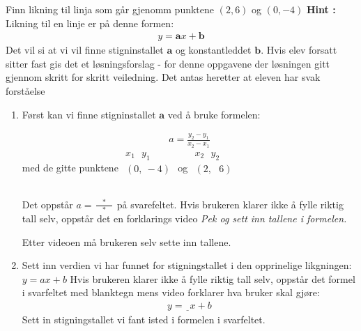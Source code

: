 \documentclass[12pt,twoside,onecolumn]{article}
\begin{document}
\begin{Exercise}
Finn likning til linja som går gjenomm punktene $(2,6)$  og  $(0,-4 )$
\newline\newline
\textbf{Hint :}\newline 
Likning til en linje er på denne formen:
\begin{align}
y=\mathbf{a}x+ \mathbf{b}
\end{align}
Det vil si at vi vil finne stigninstallet $\mathbf{a}$ og konstantleddet $\mathbf{b}$.
\newline\newline
{\color{Maroon}Hvis elev forsatt sitter fast gis det et løsningsforslag -  for denne oppgavene der løsningen gitt gjennom skritt for skritt veiledning. Det antas heretter at eleven har svak forståelse}

\begin{enumerate}
\item Først kan vi finne stigninstallet $\mathbf{a}$  ved å bruke formelen:

{\color{white}
\begin{align}
a =  \frac{y_2 - y_1}{x_2 - x_1}
\end{align}
}
med de gitte punktene
$
\begin{matrix}
  x_1\:\:\: y_1 \\ 
 (0,\:-4) \\
\phantom{0}
\end{matrix}
$ og $
\begin{matrix}
  x_2\:\:\: y_2 \\ 
 (2,\:\:\:6)  \\
\phantom{0}
\end{matrix}
$ 

{\color{Maroon} Det oppstår $a=\frac{\:\:\:\:*\:\:\:\:}{\:\:\:\:*\:\:\:\:}$ på svarefeltet.
Hvis brukeren klarer ikke å fylle riktig tall selv, oppstår det en forklarings video}
\newline
\newline
{\color{gray}\emph{Pek og sett inn tallene i formelen.} }

{\color{Maroon}  Etter videoen må brukeren selv sette inn tallene.}

\item Sett inn verdien vi har funnet for stigningstallet i den opprinelige likgningen: $y = ax + b$
{\color{Maroon}
Hvis brukeren klarer ikke å fylle riktig tall selv, oppstår det formel i svarfeltet med blanktegn mens video forklarer hva bruker skal gjøre: 
\begin{align}
y = \underline{\phantom{0}}x + b
\end{align}}
{\color{gray}Sett in stigningstallet vi fant isted i formelen i svarfeltet. }


\end{enumerate}
\end{Exercise}
\end{document}
